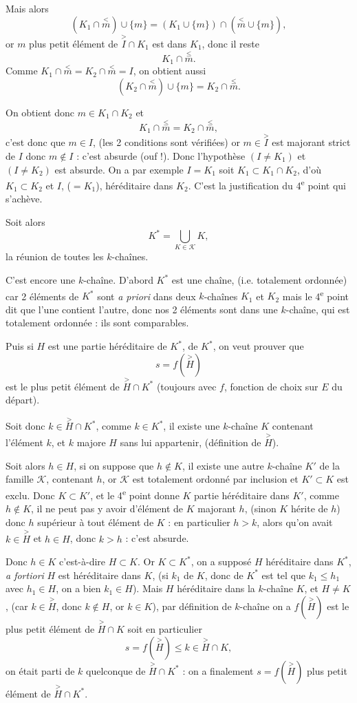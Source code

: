 Mais alors
\[
(K_1\cap\overset{<}{m})\cup\{m\}
=(K_1\cup\{m\})\cap(\overset{<}{m}\cup\{m\}),
\]
or $m$ plus petit élément de $\overset{>}{I}\cap K_1$ est dans $K_1$, donc il reste
\[
K_1\cap\overset{\le}{m}.
\]
Comme $K_1\cap\overset{<}{m}=K_2\cap\overset{<}{m}=I$, on obtient aussi
\[
(K_2\cap\overset{<}{m})\cup\{m\}=K_2\cap\overset{\le}{m}.
\]

On obtient donc $m\in K_1\cap K_2$ et
\[
K_1\cap\overset{\le}{m}=K_2\cap\overset{\le}{m},
\]
c'est donc que $m\in I$, (les 2 conditions sont vérifiées) or $m\in\overset{>}{I}$ est majorant strict de $I$ donc $m\notin I$ : c'est absurde (ouf !). Donc l'hypothèse $(I\ne K_1)$ et $(I\ne K_2)$ est absurde. On a par exemple $I=K_1$ soit $K_1\subset K_1\cap K_2$, d'où $K_1\subset K_2$ et $I$, ($=K_1$), héréditaire dans $K_2$. C'est la justification du 4\textsuperscript{e} point qui s'achève. \bookend

Soit alors
\[
K^*=\bigcup_{K\in\mathcal K}K,
\]
la réunion de toutes les $k$-chaînes.

C'est encore une $k$-chaîne. D'abord $K^*$ est une chaîne, (i.e. totalement ordonnée) car 2 éléments de $K^*$ sont \emph{a priori} dans deux $k$-chaînes $K_1$ et $K_2$ mais le 4\textsuperscript{e} point dit que l'une contient l'autre, donc nos 2 éléments sont dans une $k$-chaîne, qui est totalement ordonnée : ils sont comparables.

Puis si $H$ est une partie héréditaire de $K^*$,  de $K^*$, on veut prouver que
\[
s=f(\overset{>}{H})
\]
est le plus petit élément de $\overset{>}{H}\cap K^*$ (toujours avec $f$, fonction de choix sur $E$ du départ).

Soit donc $k\in\overset{>}{H}\cap K^*$, comme $k\in K^*$, il existe une $k$-chaîne $K$ contenant l'élément $k$, et $k$ majore $H$ sans lui appartenir, (définition de $\overset{>}{H}$).

Soit alors $h\in H$, si on suppose que $h\notin K$, il existe une autre $k$-chaîne $K'$ de la famille $\mathcal K$, contenant $h$, or $\mathcal K$ est totalement ordonné par inclusion et $K'\subset K$ est exclu. Donc $K\subset K'$, et le 4\textsuperscript{e} point donne $K$ partie héréditaire dans $K'$, comme $h\notin K$, il ne peut pas y avoir d'élément de $K$ majorant $h$, (sinon $K$ hérite de $h$) donc $h$ supérieur à tout élément de $K$ : en particulier $h>k$, alors qu'on avait $k\in\overset{>}{H}$ et $h\in H$, donc $k>h$ : c'est absurde.

Donc $h\in K$ c'est-à-dire $H\subset K$. Or $K\subset K^*$, on a supposé $H$ héréditaire dans $K^*$, \emph{a fortiori} $H$ est héréditaire dans $K$, (si $k_1$ de $K$, donc de $K^*$ est tel que $k_1\le h_1$ avec $h_1\in H$, on a bien $k_1\in H$). Mais $H$ héréditaire dans la $k$-chaîne $K$, et $H\ne K$, (car $k\in\overset{>}{H}$, donc $k\notin H$, or $k\in K$), par définition de $k$-chaîne on a $f(\overset{>}{H})$ est le plus petit élément de $\overset{>}{H}\cap K$ soit en particulier
\[
s=f(\overset{>}{H})\le k\in\overset{>}{H}\cap K,
\]
on était parti de $k$ quelconque de $\overset{>}{H}\cap K^*$ : on a finalement $s=f(\overset{>}{H})$ plus petit élément de $\overset{>}{H}\cap K^*$.

